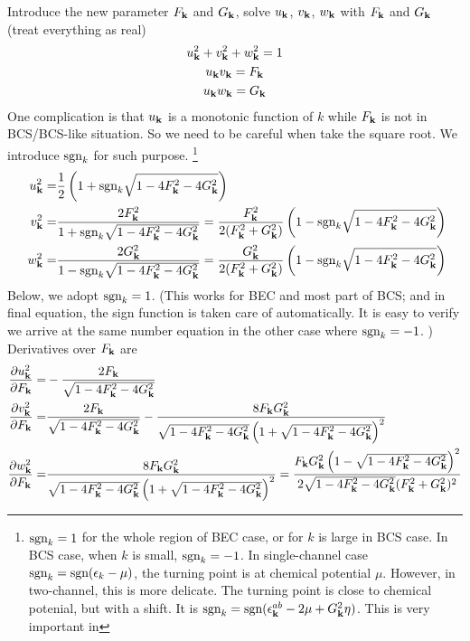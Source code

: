 \documentclass{article}
\begin{document}
Introduce the new parameter $F_{\mathbf{k}}$ and $G_{\mathbf{k}}$,  solve $u_{\mathbf{k}}$, $v_{\mathbf{k}}$, $w_{\mathbf{k}}$ with $F_{\mathbf{k}}$ and $G_{\mathbf{k}}$ (treat everything as real)
\begin{gather}
u_{\mathbf{k}}^2+v^{2}_{\mathbf{k}}+w^{2}_{\mathbf{k}}=1\\
u_{\mathbf{k}}v_{\mathbf{k}}=F_{\mathbf{k}}\\
u_{\mathbf{k}}w_{\mathbf{k}}=G_{\mathbf{k}}
\end{gather}
One complication is that $u_{\mathbf{k}}$ is a monotonic function of $k$ while $F_{\mathbf{k}}$ is not in BCS/BCS-like situation.  So we need to be careful when take the square root.  We introduce $\text{sgn}_k$ for such purpose.  \footnote{\label{foot:20100909:sgn} $\text{sgn}_k=1$  for the whole region of BEC case, or for $k$ is large in BCS case. In BCS case, when $k$ is small, $\text{sgn}_{k}=-1$.  In single-channel case $\text{sgn}_{k}=\text{sgn}(\epsilon_{k}-\mu)$, the turning point is at chemical potential $\mu$.  However, in two-channel, this is more delicate.  The turning point is close to chemical potenial, but with a shift. It is $\text{sgn}_k=\text{sgn}(\epsilon^{ab}_{\mathbf{k}}-2\mu+  G_{\mathbf{k}}^2\eta)$.  This is very important in }\begin{equation}
\begin{split}
u_{\mathbf{k}}^2=&\frac{1}{2} \left(1+\text{sgn}_{k}\sqrt{1-4 F_{\mathbf{k}}^2-4 G_{\mathbf{k}}^2}\right)\\
v^{2}_{\mathbf{k}}=&\frac{2 F_{\mathbf{k}}^2}{1+\text{sgn}_{k}\sqrt{1-4 F_{\mathbf{k}}^2-4 G_{\mathbf{k}}^2}}
=\frac{ F_{\mathbf{k}}^2}{2( F_{\mathbf{k}}^2+ G_{\mathbf{k}}^2)} \left(1-\text{sgn}_{k}\sqrt{1-4 F_{\mathbf{k}}^2-4 G_{\mathbf{k}}^2}\right)\\\
w^{2}_{\mathbf{k}}=&\frac{2 G_{\mathbf{k}}^2}{1-\text{sgn}_{k}\sqrt{1-4 F_{\mathbf{k}}^2-4 G_{\mathbf{k}}^2}}
=\frac{G_{\mathbf{k}}^2}{2( F_{\mathbf{k}}^2+ G_{\mathbf{k}}^2)} \left(1-\text{sgn}_{k}\sqrt{1-4 F_{\mathbf{k}}^2-4 G_{\mathbf{k}}^2}\right)
\end{split}
\end{equation}
Below, we adopt $\text{sgn}_k=1$. (This works for BEC and most part of BCS; and in final equation, the sign function is taken care of automatically.  It is easy to verify we arrive at the same number equation in the other case where $\text{sgn}_{k}=-1$. ) Derivatives over $F_{\mathbf{k}}$ are
\begin{equation}
\begin{split}
\frac{\partial{u_{\ensuremath{\mathbf{k}}}^2}}{\partial{F_{\ensuremath{\mathbf{k}}}}}=&-\frac{2 F_{\mathbf{k}}}{\sqrt{1-4 F_{\mathbf{k}}^2-4 G_{\mathbf{k}}^2}}\\
\frac{\partial{v_{\ensuremath{\mathbf{k}}}^2}}{\partial{F_{\ensuremath{\mathbf{k}}}}}=&\frac{2 F_{\mathbf{k}}}{\sqrt{1-4 F_{\mathbf{k}}^2-4 G_{\mathbf{k}}^2}}-\frac{8 F_{\mathbf{k}} G_{\mathbf{k}}^2}{\sqrt{1-4 F_{\mathbf{k}}^2-4 G_{\mathbf{k}}^2} \left(1+\sqrt{1-4 F_{\mathbf{k}}^2-4 G_{\mathbf{k}}^2}\right)^2}\\
\frac{\partial{w_{\ensuremath{\mathbf{k}}}^2}}{\partial{F_{\ensuremath{\mathbf{k}}}}}=&\frac{8 F_{\mathbf{k}} G_{\mathbf{k}}^2}{\sqrt{1-4 F_{\mathbf{k}}^2-4 G_{\mathbf{k}}^2} \left(1+\sqrt{1-4 F_{\mathbf{k}}^2-4 G_{\mathbf{k}}^2}\right)^2}
=\frac{F_{\mathbf{k}} G_{\mathbf{k}}^2 \left(1-\sqrt{1-4 F_{\mathbf{k}}^2-4 G_{\mathbf{k}}^2}\right)^2}{2\sqrt{1-4 F_{\mathbf{k}}^2-4 G_{\mathbf{k}}^2} (F_{\mathbf{k}}^2 + G_{\mathbf{k}}^2)^2}
\end{split}
\end{equation}
\end{document}
